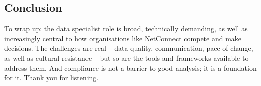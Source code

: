 \documentclass[12pt,a4paper]{article}
\begin{document}
\subsection{Conclusion}

To wrap up: the data specialist role is broad, technically demanding, as well as increasingly central to how organisations like NetConnect compete and make decisions. The challenges are real -- data quality, communication, pace of change, as well as cultural resistance -- but so are the tools and frameworks available to address them. And compliance is not a barrier to good analysis; it is a foundation for it. Thank you for listening.

\newpage
\printbibliography[title={References}]
\end{document}
